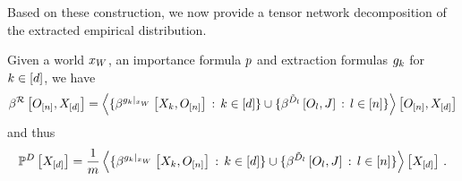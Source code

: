 Based on these construction, we now provide a tensor network decomposition of the extracted empirical distribution.

\begin{theorem}
    Given a \firstOrderLogic{} world $x_{W}$, an importance formula $p$ and extraction formulas $g_{k}$ for $k\in[d]$, we have
    \begin{align*}
        \beta^{\mathcal{R}}\left[O_{[n]},X_{[d]}\right] =
        \left\langle 
            \{\beta^{{g_{k}}|_{x_{W}}}\left[X_{k},O_{[n]}\right] \, : \, k\in[d]\}
            \cup \{\beta^{\tilde{D}_{l}}\left[O_{l},J\right] \, : \, l\in[n]\}
        \right\rangle \left[ O_{[n]},X_{[d]} \right]
    \end{align*}
    and thus
    \begin{align*}
        \mathbb{P}^{D}\left[X_{[d]}\right] =
        \frac{1}{m}  \left\langle 
            \{\beta^{{g_{k}}|_{x_{W}}}\left[X_{k},O_{[n]}\right] \, : \, k\in[d]\}
            \cup \{\beta^{\tilde{D}_{l}}\left[O_{l},J\right] \, : \, l\in[n]\}
        \right\rangle \left[ X_{[d]} \right] \, .
    \end{align*}
\end{theorem}
